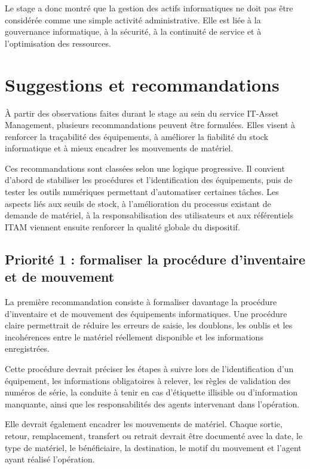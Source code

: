 \documentclass[12pt,a4paper]{report}
\begin{document}
Le stage a donc montré que la gestion des actifs informatiques ne doit pas être considérée comme une simple activité administrative. Elle est liée à la gouvernance informatique, à la sécurité, à la continuité de service et à l'optimisation des ressources.

\section{Suggestions et recommandations}

À partir des observations faites durant le stage au sein du service IT-Asset Management, plusieurs recommandations peuvent être formulées. Elles visent à renforcer la traçabilité des équipements, à améliorer la fiabilité du stock informatique et à mieux encadrer les mouvements de matériel.

Ces recommandations sont classées selon une logique progressive. Il convient d'abord de stabiliser les procédures et l'identification des équipements, puis de tester les outils numériques permettant d'automatiser certaines tâches. Les aspects liés aux seuils de stock, à l'amélioration du processus existant de demande de matériel, à la responsabilisation des utilisateurs et aux référentiels ITAM viennent ensuite renforcer la qualité globale du dispositif.

\subsection{Priorité 1 : formaliser la procédure d'inventaire et de mouvement}

La première recommandation consiste à formaliser davantage la procédure d'inventaire et de mouvement des équipements informatiques. Une procédure claire permettrait de réduire les erreurs de saisie, les doublons, les oublis et les incohérences entre le matériel réellement disponible et les informations enregistrées.

Cette procédure devrait préciser les étapes à suivre lors de l'identification d'un équipement, les informations obligatoires à relever, les règles de validation des numéros de série, la conduite à tenir en cas d'étiquette illisible ou d'information manquante, ainsi que les responsabilités des agents intervenant dans l'opération.

Elle devrait également encadrer les mouvements de matériel. Chaque sortie, retour, remplacement, transfert ou retrait devrait être documenté avec la date, le type de matériel, le bénéficiaire, la destination, le motif du mouvement et l'agent ayant réalisé l'opération.
\end{document}
